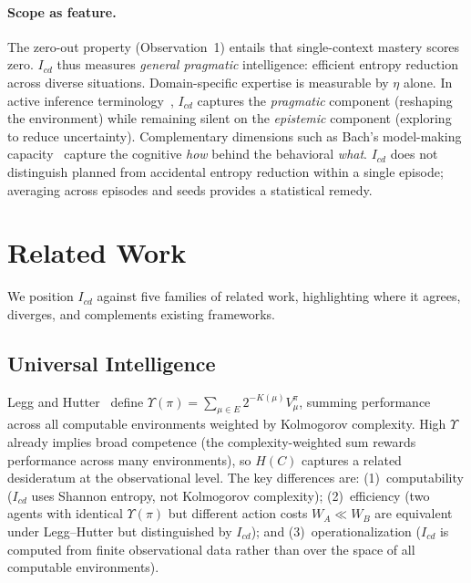 \documentclass[runningheads,a4paper]{llncs}
\begin{document}
\paragraph{Scope as feature.} The zero-out property (Observation~1) entails that single-context mastery scores zero. $I_{cd}$ thus measures \emph{general pragmatic} intelligence: efficient entropy reduction across diverse situations. Domain-specific expertise is measurable by $\eta$ alone. In active inference terminology~\cite{parr2022active,millidge2021whence}, $I_{cd}$ captures the \emph{pragmatic} component (reshaping the environment) while remaining silent on the \emph{epistemic} component (exploring to reduce uncertainty). Complementary dimensions such as Bach's model-making capacity~\cite{bach2009principles} capture the cognitive \emph{how} behind the behavioral \emph{what}. $I_{cd}$ does not distinguish planned from accidental entropy reduction within a single episode; averaging across episodes and seeds provides a statistical remedy.

\section{Related Work}
\label{sec:related}

We position $I_{cd}$ against five families of related work, highlighting where it agrees, diverges, and complements existing frameworks.

\subsection{Universal Intelligence}
\label{sec:universal-intelligence}

Legg and Hutter~\cite{legg2007universal} define $\Upsilon(\pi) = \sum_{\mu \in E} 2^{-K(\mu)} V_\mu^\pi$, summing performance across all computable environments weighted by Kolmogorov complexity. High $\Upsilon$ already implies broad competence (the complexity-weighted sum rewards performance across many environments), so $H(C)$ captures a related desideratum at the observational level. The key differences are: (1)~computability ($I_{cd}$ uses Shannon entropy, not Kolmogorov complexity); (2)~efficiency (two agents with identical $\Upsilon(\pi)$ but different action costs $W_A \ll W_B$ are equivalent under Legg--Hutter but distinguished by $I_{cd}$); and (3)~operationalization ($I_{cd}$ is computed from finite observational data rather than over the space of all computable environments).
\end{document}
